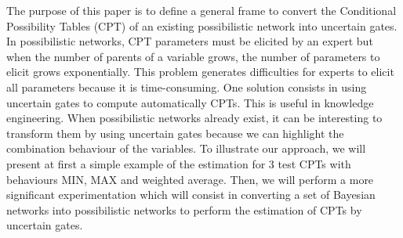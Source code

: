 
The purpose of this paper is to define a general frame to convert the Conditional Possibility Tables (CPT) of an existing possibilistic network into uncertain gates. In possibilistic networks, CPT parameters must be elicited by an expert but when the number of parents of a variable grows, the number of parameters to elicit grows exponentially.	This problem generates difficulties for experts to elicit all parameters because it is time-consuming. One solution consists in using uncertain gates to compute automatically CPTs. This is useful in knowledge engineering. When possibilistic networks already exist, it can be interesting to transform them by using uncertain gates because we can highlight the  combination behaviour of the variables. To illustrate our approach, we will present at first a simple example of the estimation for 3 test CPTs with behaviours MIN, MAX and weighted average. Then, we will perform a more significant experimentation which will consist in converting a set of Bayesian networks into possibilistic networks to perform the estimation of CPTs by uncertain gates. 


